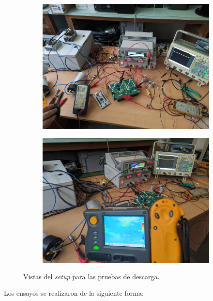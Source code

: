 \begin{figure}[H]
	\centering
	\begin{subfigure}[b]{0.45\textwidth}
		\centering
		\includegraphics[width=\textwidth]{fig/setupDischarge1}
	\end{subfigure}
	\hfill
	\begin{subfigure}[b]{0.45\textwidth}
		\centering
		\includegraphics[width=\textwidth]{fig/setupDischarge2}
	\end{subfigure}
	\caption{Vistas del \textit{setup} para las pruebas de descarga.}

\end{figure}


Los ensayos se realizaron de la siguiente forma: 

